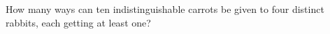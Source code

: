 How many ways can ten indistinguishable carrots be given to four distinct rabbits, each getting at least one?
